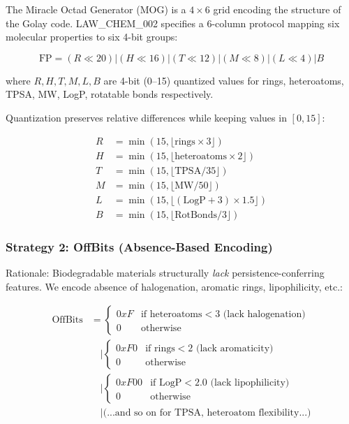 \documentclass[11pt,letterpaper]{article}
\begin{document}
The Miracle Octad Generator (MOG) is a $4 \times 6$ grid encoding the structure of the Golay code. LAW\_CHEM\_002 specifies a 6-column protocol mapping six molecular properties to six 4-bit groups:

\begin{equation}
\text{FP} = (R \ll 20) | (H \ll 16) | (T \ll 12) | (M \ll 8) | (L \ll 4) | B
\end{equation}

where $R, H, T, M, L, B$ are 4-bit (0--15) quantized values for rings, heteroatoms, TPSA, MW, LogP, rotatable bonds respectively.

Quantization preserves relative differences while keeping values in $[0, 15]$:

\begin{align}
R &= \min(15, \lfloor \text{rings} \times 3 \rfloor) \\
H &= \min(15, \lfloor \text{heteroatoms} \times 2 \rfloor) \\
T &= \min(15, \lfloor \text{TPSA} / 35 \rfloor) \\
M &= \min(15, \lfloor \text{MW} / 50 \rfloor) \\
L &= \min(15, \lfloor (\text{LogP} + 3) \times 1.5 \rfloor) \\
B &= \min(15, \lfloor \text{RotBonds} / 3 \rfloor)
\end{align}

\subsubsection{Strategy 2: OffBits (Absence-Based Encoding)}

Rationale: Biodegradable materials structurally \emph{lack} persistence-conferring features. We encode absence of halogenation, aromatic rings, lipophilicity, etc.:

\begin{align}
\text{OffBits} &= \begin{cases}
0xF & \text{if heteroatoms} < 3 \text{ (lack halogenation)} \\
0 & \text{otherwise}
\end{cases} \\
&\quad | \begin{cases}
0xF0 & \text{if rings} < 2 \text{ (lack aromaticity)} \\
0 & \text{otherwise}
\end{cases} \\
&\quad | \begin{cases}
0xF00 & \text{if LogP} < 2.0 \text{ (lack lipophilicity)} \\
0 & \text{otherwise}
\end{cases} \\
&\quad | \text{(...and so on for TPSA, heteroatom flexibility...)}
\end{align}
\end{document}
